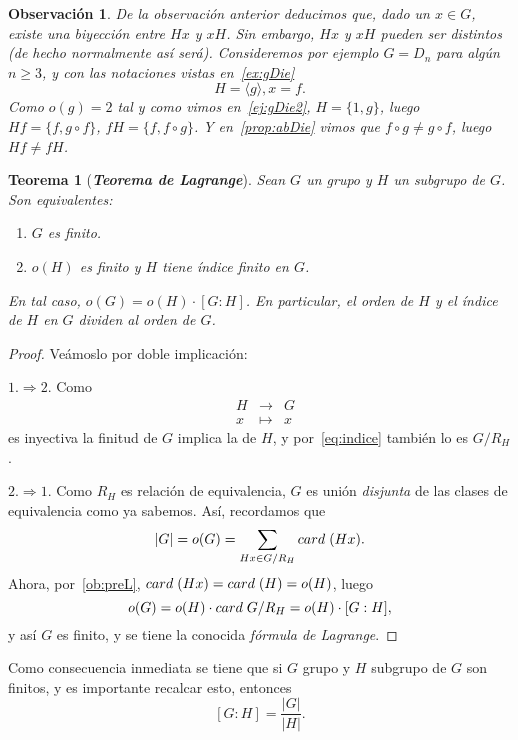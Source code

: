 \documentclass[12pt]{article}
\newtheorem{theorem}{Teorema}[section]
\newtheorem{observation}{Observación}[theorem]
\begin{document}
\begin{observation}De la observación anterior deducimos que, dado un $x \in G$, existe una biyección entre $Hx$ y $xH$. Sin embargo, $Hx$ y $xH$ pueden ser distintos (de hecho normalmente así será). Consideremos por ejemplo $G = D_n$ para algún $n \geq 3$, y con las notaciones vistas en~\ref{ex:gDie} $$H = \langle g \rangle, x = f.$$ Como $o(g) = 2$ tal y como vimos en~\ref{ej:gDie2}, $H = \lbrace 1,g \rbrace$, luego $Hf = \lbrace f, g \circ f \rbrace$, $fH = \lbrace f, f \circ g \rbrace$. Y en~\ref{prop:abDie} vimos que $f \circ g \neq g \circ f$, luego $Hf \neq fH$.
\end{observation}

\begin{theorem}[\textbf{\textit{Teorema de Lagrange}}]
Sean $G$ un grupo y $H$ un subgrupo de $G$. Son equivalentes:
\begin{enumerate}
\item $G$ es finito.
\item $o(H)$ es finito y $H$ tiene índice finito en $G$.
\end{enumerate}
En tal caso, $o(G) = o(H) \cdot [G:H]$. En particular, el orden de $H$ y el índice de $H$ en $G$ dividen al orden de $G$.
\end{theorem}
\begin{proof}
Veámoslo por doble implicación:

$1. \Rightarrow 2.$ Como $$\begin{array}{rccl}
&H & \longrightarrow & G\\
&x & \longmapsto &x
\end{array}$$ es inyectiva la finitud de $G$ implica la de $H$, y por~\ref{eq:indice} también lo es $G/R_{H}$.

$2. \Rightarrow 1.$ Como $R_{H}$ es relación de equivalencia, $G$ es unión \textit{disjunta} de las clases de equivalencia como ya sabemos. Así, recordamos que $$|G| = o(G) = \sum_{Hx\in G/R_{H}} card \hspace{0.1cm} (Hx).$$ Ahora, por~\ref{ob:preL}, $card \hspace{0.1cm} (Hx) = card \hspace{0.1cm} (H) = o(H)$, luego $$o(G) = o(H) \cdot card \hspace{0.1cm} G/R_{H} = o(H) \cdot [G: H],$$ y así $G$ es finito, y se tiene la conocida \textit{fórmula de Lagrange}.

\end{proof}

Como consecuencia inmediata se tiene que si $G$ grupo y $H$ subgrupo de $G$ son finitos, y es importante recalcar esto, entonces $$\left[ G:H \right] = \frac{|G|}{|H|}.$$
\end{document}
